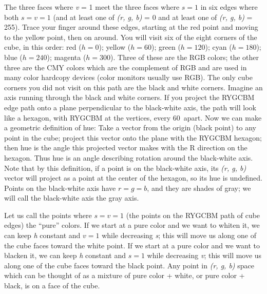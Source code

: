 The three faces where {\it v} = 1 meet the three faces where $s = 1$
in six edges where both $s = v = 1$ (and at least one of {\it (r, g, b)}
= 0 and at least one of {\it (r, g, b)} = 255).  Trace your finger
around these edges, starting at the red point and moving to the yellow
point, then on around.  You will visit six of the eight corners of the
cube, in this order:  red ($h = 0$); yellow ($h = 60$); green
($h = 120$); cyan ($h = 180$); blue ($h = 240$); magenta
($h = 300$).  Three of these are the RGB colors; the other three
are the CMY colors which are the complement of RGB and are used in many
color hardcopy devices (color monitors usually use RGB).  The only cube
corners you did not visit on this path are the black and white corners.
Imagine an axis running through the black and white corners.  If you
project the RYGCBM edge path onto a plane perpendicular to the black-white
axis, the path will look like a hexagon, with RYGCBM at the vertices,
every 60\DS\ apart.  Now we can make a geometric definition of hue:
Take a vector from the origin (black point) to any point in the cube;
project this vector onto the plane with the RYGCBM hexagon; then hue is
the angle this projected vector makes with the R direction on the hexagon.
Thus hue is an angle describing rotation around the black-white axis.
Note that by this definition, if a point is on the black-white axis, its
{\it (r, g, b)} vector will project as a point at the center of the
hexagon, so its hue is undefined.  Points on the black-white axis have
$r = g = b$, and they are shades of gray; we will call the black-white
axis the gray axis.

Let us call the points where $s = v = 1$ (the points on the RYGCBM
path of cube edges) the ``pure'' colors.  If we start at a pure color
and we want to whiten it, we can keep {\it h} constant and $v = 1$
while decreasing {\it s}; this will move us along one of the cube
faces toward the white point.  If we start at a pure color and we want
to blacken it, we can keep {\it h} constant and $s = 1$ while decreasing
{\it v}; this will move us along one of the cube faces toward the black
point.  Any point in {\it (r, g, b)} space which can be thought of as a
mixture of pure color + white, or pure color + black, is on a face of
the cube.

